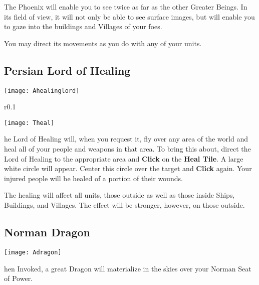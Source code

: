 The Phoenix will enable you to see twice as far as the other Greater Beings. In its field of view, it will not only be able to see surface images, but will enable you to gaze into the buildings and Villages of your foes.

You may direct its movements as you do with any of your units.

\subsection{Persian Lord of Healing}


\begin{center}
    \texttt{[image: Ahealinglord]}
\end{center}

\begin{wrapfigure}{r}{0.1\textwidth}
    \vspace{-20pt}
    \begin{center}
        \texttt{[image: Theal]}
    \end{center}
    \vspace{-20pt}
\end{wrapfigure}

he Lord of Healing will, when you request it, fly over any area of the world and heal all of your people and weapons in that area. To bring this about, direct the Lord of Healing to the appropriate area and \textbf{Click} on the \textbf{Heal Tile}. A large white circle will appear. Center this circle over the target and \textbf{Click} again. Your injured people will be healed of a portion of their wounds.

The healing will affect all units, those outside as well as those inside Ships, Buildings, and Villages. The effect will be stronger, however, on those outside.

\subsection{Norman Dragon}


\begin{center}
    \texttt{[image: Adragon]}
\end{center}

hen Invoked, a great Dragon will materialize in the skies over your Norman Seat of Power.

